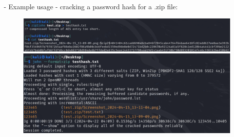 \documentclass[10pt,oneside,english,a4paper]{article}
\begin{document}
- Example usage - cracking a password hash for a .zip file:
\begin{figure}[h]
	\centering
	\includegraphics[scale = 0.50]{jtr_zip.png}
	\centering
	\includegraphics[scale = 0.50]{jtr_zip_2.png}
\end{figure}\\


\clearpage
\end{document}
